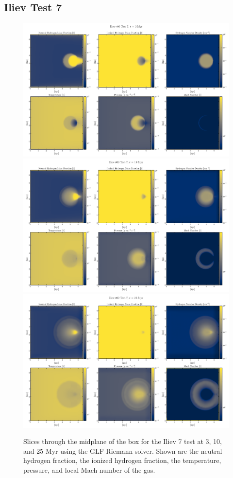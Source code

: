 \subsection{Iliev Test 7}\label{chap:Iliev7}


\begin{figure}
\centering
\includegraphics[width=.75\textwidth]{figures/RHD/Iliev7/output_0003-GLF.png}\\
\includegraphics[width=.75\textwidth]{figures/RHD/Iliev7/output_0010-GLF.png}\\
\includegraphics[width=.75\textwidth]{figures/RHD/Iliev7/output_0025-GLF.png}
\caption{
Slices through the midplane of the box for the Iliev 7 test at 3, 10, and 25 Myr using the GLF
Riemann solver. Shown are the neutral hydrogen fraction, the ionized hydrogen fraction, the
temperature, pressure, and local Mach number of the gas.
}
\label{fig:iliev7-slices-GLF}
\end{figure}


